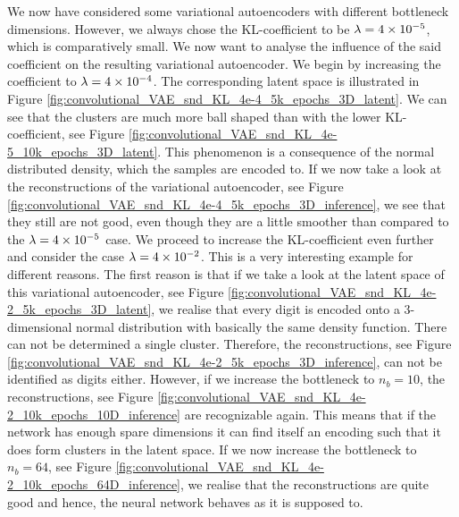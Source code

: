 We now have considered some variational autoencoders with different bottleneck dimensions. However, we always chose the KL-coefficient to be $\lambda = \num{4e-5}$, which is comparatively small. We now want to analyse the influence of the said coefficient on the resulting variational autoencoder. We begin by increasing the coefficient to $\lambda = \num{4e-4}$. The corresponding latent space is illustrated in Figure \ref{fig:convolutional_VAE_snd_KL_4e-4_5k_epochs_3D_latent}. We can see that the clusters are much more ball shaped than with the lower KL-coefficient, see Figure \ref{fig:convolutional_VAE_snd_KL_4e-5_10k_epochs_3D_latent}. This phenomenon is a consequence of the normal distributed density, which the samples are encoded to. If we now take a look at the reconstructions of the variational autoencoder, see Figure \ref{fig:convolutional_VAE_snd_KL_4e-4_5k_epochs_3D_inference}, we see that they still are not good, even though they are a little smoother than compared to the $\lambda = \num{4e-5}$ case.
We proceed to increase the KL-coefficient even further and consider the case $\lambda = \num{4e-2}$. This is a very interesting example for different reasons. The first reason is that if we take a look at the latent space of this variational autoencoder, see Figure \ref{fig:convolutional_VAE_snd_KL_4e-2_5k_epochs_3D_latent}, we realise that every digit is encoded onto a $3$-dimensional normal distribution with basically the same density function. There can not be determined a single cluster. Therefore, the reconstructions, see Figure \ref{fig:convolutional_VAE_snd_KL_4e-2_5k_epochs_3D_inference}, can not be identified as digits either. However, if we increase the bottleneck to $n_b=10$, the reconstructions, see Figure \ref{fig:convolutional_VAE_snd_KL_4e-2_10k_epochs_10D_inference} are recognizable again. This means that if the network has enough \glqq spare dimensions\grqq{} it can find itself an encoding such that it does form clusters in the latent space. If we now increase the bottleneck to $n_b=64$, see Figure \ref{fig:convolutional_VAE_snd_KL_4e-2_10k_epochs_64D_inference}, we realise that the reconstructions are quite good and hence, the neural network behaves as it is supposed to.\\
